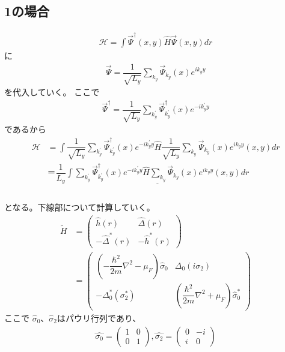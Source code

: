 \documentclass{jarticle}
\begin{document}
\subsection{1の場合}
	\begin{align}
	\mathcal{H}=\int\vec{\Psi}^\dagger(x,y)\hat{H}\vec{\Psi}(x,y)dr
	\end{align}
	に
	\begin{align}
	\vec{\Psi}=\dfrac{1}{\sqrt{L_y}}\displaystyle\sum_{k_y}\vec{\Psi}_{k_y}(x)e^{ik_yy}
	\end{align}
	を代入していく。
	ここで
	\begin{align}
	\vec{\Psi}^\dagger=\dfrac{1}{\sqrt{L_y}}\displaystyle\sum_{k_y^{'}}\vec{\Psi}^\dagger_{k_y^{'}}(x)e^{-ik_y^{'}y}
	\end{align}
	であるから
	\begin{align}
	\mathcal{H}&=\int\dfrac{1}{\sqrt{L_y}}\displaystyle\sum_{k_y^{'}}\vec{\Psi}^\dagger_{k_y^{'}}(x)e^{-ik_y^{'}y}\hat{H}\dfrac{1}{\sqrt{L_y}}\displaystyle\sum_{k_y}\vec{\Psi}_{k_y}(x)e^{ik_yy}(x,y)dr\\&＝\dfrac{1}{L_y}\underline{\int\displaystyle\sum_{k_y^{'}}\vec{\Psi}^\dagger_{k_y^{'}}(x)e^{-ik_y^{'}y}\hat{H}\displaystyle\sum_{k_y}\vec{\Psi}_{k_y}(x)e^{ik_yy}(x,y)dr}\\
	\label{star}
	\end{align}
	\\となる。下線部について計算していく。
	\begin{align}
	\tilde{H}&=
	\begin{pmatrix}
	\hat{h}(r) & \hat{\Delta}(r) \\
	-\hat{\Delta}^{*}(r) & -\hat{h}^{*}(r)
	\end{pmatrix}
	\\&=
	\begin{pmatrix}
	(-\dfrac{\hbar^2}{2m}\nabla^2-\mu_F)\hat{\sigma}_0 & \Delta_0(i\sigma_2) \\
	-\Delta^{*}_0(\sigma^{*}_2) & (\dfrac{\hbar^2}{2m}\nabla^2+\mu_F)\hat{\sigma}^{*}_0		%
	\end{pmatrix}
	\end{align}
	ここで
	$\hat\sigma_0$、$\hat\sigma_2$はパウリ行列であり、
	\begin{align}
	\hat{\sigma_0}=
	\begin{pmatrix}
	1 & 0 \\
	0 & 1
	\end{pmatrix},
	\hat{\sigma_2}=
	\begin{pmatrix}
	0 & -i \\
	i & 0
	\end{pmatrix}
	\end{align}
\end{document}
